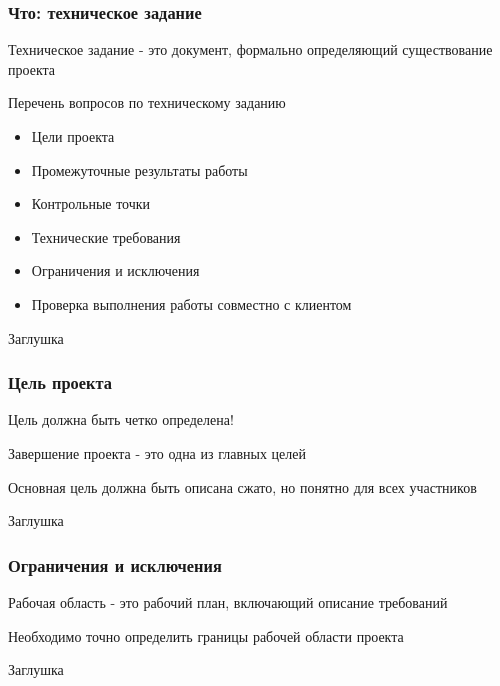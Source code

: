 \documentclass{../industrial-development}
\begin{document}
    \begin{frame} \frametitle{Что: техническое задание}
        \begin{definition}
            Техническое задание - это документ, формально определяющий существование проекта
        \end{definition}
        \begin{block}{Перечень вопросов по техническому заданию}
            \begin{itemize}
            \item Цели проекта
            \item Промежуточные результаты работы
            \item Контрольные точки
            \item Технические требования
            \item Ограничения и исключения
            \item Проверка выполнения работы совместно с клиентом
            \end{itemize}
        \end{block}
    \end{frame}
    \lecturenotes
    Заглушка

    \begin{frame} \frametitle{Цель проекта}
        \begin{block}{}
            Цель должна быть четко определена!
        \end{block}
        \begin{block}{}
            Завершение проекта - это одна из главных целей
        \end{block}
        \begin{block}{}
            Основная цель должна быть описана сжато, но понятно для всех участников
        \end{block}
    \end{frame}
    \lecturenotes
    Заглушка

    \begin{frame} \frametitle{Ограничения и исключения}
        \begin{definition}
            Рабочая область - это рабочий план, включающий описание требований
        \end{definition}
        \begin{block}{}
            Необходимо точно определить границы рабочей области проекта
        \end{block}
    \end{frame}
    \lecturenotes
    Заглушка
    
\end{document}
